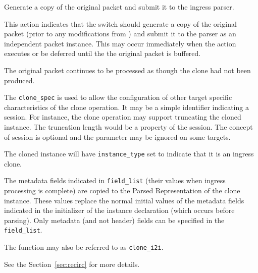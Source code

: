\documentclass[12pt]{article}
\begin{document}
{ %
Generate a copy of the original packet and submit it to the ingress parser.
}
{ %
}
{ %
This action indicates that the switch should generate a copy of the original 
packet (prior to any modifications from \matchaction) and submit it to the 
parser as an independent packet instance.  This may occur immediately when 
the action executes or be deferred until the the original packet is buffered. 
 

The original packet continues to be processed as though the clone had not 
been produced.

The \texttt{clone_spec} is used to allow the configuration of other target specific 
characteristics of the clone operation. It may be a simple identifier indicating 
a session. For instance, the clone operation may support truncating the cloned 
instance. The truncation length would be a property of the session. The concept 
of session is optional and the parameter may be ignored on some targets.

The cloned instance will have \texttt{instance_type} set to indicate that it is an 
ingress clone. 

The metadata fields indicated in \texttt{field_list} (their values when ingress processing is complete) are copied to the Parsed Representation 
of the clone instance. These values replace the normal initial values of the 
metadata fields indicated in the initializer of the instance declaration (which 
occurs before parsing). Only metadata (and not header) fields can be specified in the \texttt{field_list}.

The function may also be referred to as \texttt{clone_i2i}.

See the Section~\ref{sec:recirc} for more details.
}

\end{document}
